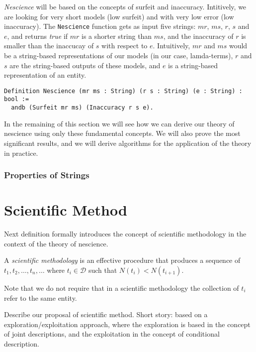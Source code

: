 \emph{Nescience} will be based on the concepts of surfeit and inaccuracy. Intitively, we are looking for very short models (low surfeit) and with very low error (low inaccuracy). The \texttt{Nescience} function gets as input five strings: $mr$, $ms$, $r$, $s$ and $e$, and returns \emph{true} if $mr$ is a shorter string than $ms$, and the inaccuracy of $r$ is smaller than the inaccucay of $s$ with respect to $e$. Intuitively, $mr$ and $ms$ would be a string-based representations of our models (in our case, lamda-terms), $r$ and $s$ are the string-based outputs of these models, and $e$ is a string-based representation of an entity.

\begin{sourcecode}
{\scriptsize \begin{verbatim}
Definition Nescience (mr ms : String) (r s : String) (e : String) : bool :=
  andb (Surfeit mr ms) (Inaccuracy r s e).
\end{verbatim}}
\end{sourcecode}

In the remaining of this section we will see how we can derive our theory of nescience using only these fundamental concepts. We will also prove the most significant results, and we will derive algorithms for the application of the theory in practice.

\subsubsection*{Properties of Strings}


%
%

\section{Scientific Method}

Next definition formally introduces the concept of scientific methodology in the context of the theory of nescience.

\begin{definition}
A \emph{scientific methodology} is an effective procedure that produces a sequence of $t_1, t_2, \ldots, t_n, \ldots$ where $t_i \in \mathcal{D}$ such that $N(t_i) < N(t_{i+1})$.
\end{definition}

Note that we do not require that in a scientific methodology the collection of $t_i$ refer to the same entity.


{\color{red} Describe our proposal of scientific method. Short story: based on a exploration/exploitation approach, where the exploration is based in the concept of joint descriptions, and the exploitation in the concept of conditional description.}

